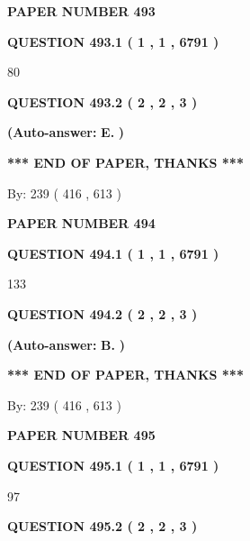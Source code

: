 \documentclass{ctexart}
\begin{document}
   
\newpage 
\setcounter{page}{ 
   493001 } 
   
   
 {\textbf{ \Large{ PAPER NUMBER  493  }}}
   
   
   
   
  
  
{\textbf{\large{QUESTION
493.1 
 ( 1 , 1 , 6791 )
}}}

80
  
  
{\textbf{\large{QUESTION
493.2 
 ( 2 , 2 , 3 )
}}}
 
 
{\textbf{(Auto-answer:}}
{\textbf{\large{
E.}}}
{\textbf{)}}
 
 
   
   
   
   
\vspace{1.0in} 
{\textbf{\large{ *** END OF PAPER, THANKS *** }}} 
   
   
\hspace{1.0in} By: 
 239 ( 416 ,  613 )
   
   
   
   
\newpage 
\setcounter{page}{ 
   494001 } 
   
   
 {\textbf{ \Large{ PAPER NUMBER  494  }}}
   
   
   
   
  
  
{\textbf{\large{QUESTION
494.1 
 ( 1 , 1 , 6791 )
}}}

133
  
  
{\textbf{\large{QUESTION
494.2 
 ( 2 , 2 , 3 )
}}}
 
 
{\textbf{(Auto-answer:}}
{\textbf{\large{
B.}}}
{\textbf{)}}
 
 
   
   
   
   
\vspace{1.0in} 
{\textbf{\large{ *** END OF PAPER, THANKS *** }}} 
   
   
\hspace{1.0in} By: 
 239 ( 416 ,  613 )
   
   
   
   
\newpage 
\setcounter{page}{ 
   495001 } 
   
   
 {\textbf{ \Large{ PAPER NUMBER  495  }}}
   
   
   
   
  
  
{\textbf{\large{QUESTION
495.1 
 ( 1 , 1 , 6791 )
}}}

97
  
  
{\textbf{\large{QUESTION
495.2 
 ( 2 , 2 , 3 )
}}}
 
\end{document}
